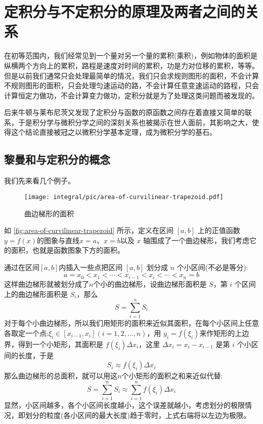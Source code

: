 
\section{定积分与不定积分的原理及两者之间的关系}
\label{sec:principle-and-relation-between-definite-and-indefinite-integral}

在初等范围内，我们经常见到一个量对另一个量的累积(乘积)，例如物体的面积是纵横两个方向上的累积，路程是速度对时间的累积，功是力对位移的累积，等等。但是以前我们通常只会处理最简单的情况，我们只会求规则图形的面积，不会计算不规则图形的面积，只会处理匀速运动的路，不会计算任意变速运动的路程，只会计算恒定力做功，不会计算变力做功，定积分就是为了处理这类问题而被发现的。

后来牛顿与莱布尼茨又发现了定积分与函数的原函数之间存在着直接又简单的联系，于是积分学与微积分学之间的深刻关系也被揭示在世人面前，其影响之大，使得这个结论直接被冠之以微积分学基本定理，成为微积分学的基石。

\subsection{黎曼和与定积分的概念}
\label{sec:riemann-sum-and-concept-of-definite-integral}

我们先来看几个例子。

\begin{example}[曲边梯形的面积]
\begin{figure}
  \centering
  \texttt{[image: integral/pic/area-of-curvilinear-trapezoid.pdf]}
  \caption{曲边梯形的面积}
  \label{fig:area-of-curvilinear-trapezoid}
\end{figure}

如 \autoref{fig:area-of-curvilinear-trapezoid} 所示，定义在区间 $[a,b]$ 上的正值函数 $y=f(x)$的图象与直线$x=a$、$x=b$以及 $x$ 轴围成了一个曲边梯形，我们考虑它的面积，也就是函数图象下方的面积。

通过在区间$[a,b]$内插入一些点把区间 $[a,b]$ 划分成 $n$ 个小区间(不必是等分):
\[ a=x_0<x_1< \cdots < x_{i-1} < x_i < \cdots < x_n = b \]
这样曲边梯形就被划分成了$n$个小的曲边梯形，设曲边梯形面积是 $S$，第 $i$ 个区间上的曲边梯形面积是 $S_i$，那么
\[ S = \sum_{i=1}^n S_i \]
对于每个小曲边梯形，所以我们用矩形的面积来近似其面积，在每个小区间上任意各取定一个点:$\xi_i\in [x_{i-1}, x_i](i=1,2,\ldots,n)$，用 $y_i=f(\xi_i)$来作矩形的上边界，得到一个小矩形，其面积是 $f(\xi_i) \Delta x_i$，这里 $\Delta x_i = x_i-x_{i-1}$ 是第 $i$ 个小区间的长度，于是
\[ S_i \approx f(\xi_i) \Delta x_i \]
那么曲边梯形的总面积，就可以用这$n$个小矩形的面积之和来近似代替:
\[ S = \sum_{i=1}^n S_i \approx \sum_{i=1}^n f(\xi_i) \Delta x_i \]
显然，小区间越多，各个小区间长度越小，这个误差就越小，考虑划分的极限情况，即划分的粒度(各小区间的最大长度)趋于零时，上式右端将以左边为极限。
\end{example}

